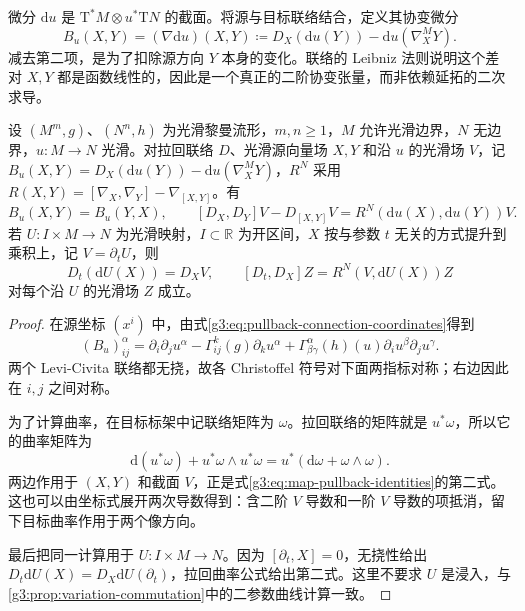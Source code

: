 \ProseParagraphBreak

微分 \(\mathrm du\) 是 \(\mathrm T^*M\otimes u^*\mathrm TN\) 的截面。将源与目标联络结合，定义其协变微分
\begin{equation}\label{g3:eq:map-second-covariant-differential}
	B_u(X,Y)=(\nabla\mathrm du)(X,Y)
	\coloneqq D_X(\mathrm du(Y))-\mathrm du(\nabla^M_XY).
\end{equation}
减去第二项，是为了扣除源方向 \(Y\) 本身的变化。联络的 Leibniz 法则说明这个差对 \(X,Y\) 都是函数线性的，因此是一个真正的二阶协变张量，而非依赖延拓的二次求导。

\begin{proposition}\label{g3:prop:map-covariant-identities}
	设 \((M^m,g)\)、\((N^n,h)\) 为光滑黎曼流形，\(m,n\ge1\)，\(M\) 允许光滑边界，\(N\) 无边界，\(u:M\to N\) 光滑。对拉回联络 \(D\)、光滑源向量场 \(X,Y\) 和沿 \(u\) 的光滑场 \(V\)，记 \(B_u(X,Y)=D_X(\mathrm du(Y))-\mathrm du(\nabla^M_XY)\)，\(R^N\) 采用 \(R(X,Y)=[\nabla_X,\nabla_Y]-\nabla_{[X,Y]}\)。有
	\begin{equation}\label{g3:eq:map-pullback-identities}
		B_u(X,Y)=B_u(Y,X),\qquad
		[D_X,D_Y]V-D_{[X,Y]}V=R^N(\mathrm du(X),\mathrm du(Y))V.
	\end{equation}
	若 \(U:I\times M\to N\) 为光滑映射，\(I\subset\mathbb R\) 为开区间，\(X\) 按与参数 \(t\) 无关的方式提升到乘积上，记 \(V=\partial_tU\)，则
	\begin{equation}\label{g3:eq:map-variation-commutation}
		D_t(\mathrm dU(X))=D_XV,\qquad
		[D_t,D_X]Z=R^N(V,\mathrm dU(X))Z
	\end{equation}
	对每个沿 \(U\) 的光滑场 \(Z\) 成立。
\end{proposition}
\begin{proof}
	在源坐标 \((x^i)\) 中，由式\eqref{g3:eq:pullback-connection-coordinates}得到
	\[
		(B_u)^\alpha_{ij}
		=\partial_i\partial_j u^\alpha
		-\Gamma^k_{ij}(g)\partial_k u^\alpha
		+\Gamma^\alpha_{\beta\gamma}(h)(u)\partial_i u^\beta\partial_j u^\gamma.
	\]
	两个 Levi-Civita 联络都无挠，故各 Christoffel 符号对下面两指标对称；右边因此在 \(i,j\) 之间对称。

	为了计算曲率，在目标标架中记联络矩阵为 \(\omega\)。拉回联络的矩阵就是 \(u^*\omega\)，所以它的曲率矩阵为
	\[
		\mathrm d(u^*\omega)+u^*\omega\wedge u^*\omega
		=u^*(\mathrm d\omega+\omega\wedge\omega).
	\]
	两边作用于 \((X,Y)\) 和截面 \(V\)，正是式\eqref{g3:eq:map-pullback-identities}的第二式。这也可以由坐标式展开两次导数得到：含二阶 \(V\) 导数和一阶 \(V\) 导数的项抵消，留下目标曲率作用于两个像方向。

	最后把同一计算用于 \(U:I\times M\to N\)。因为 \([\partial_t,X]=0\)，无挠性给出 \(D_t\mathrm dU(X)=D_X\mathrm dU(\partial_t)\)，拉回曲率公式给出第二式。这里不要求 \(U\) 是浸入，与\cref{g3:prop:variation-commutation}中的二参数曲线计算一致。
\end{proof}

